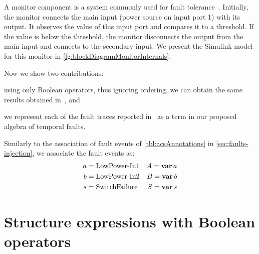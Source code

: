 \documentclass[12pt,openright,twoside,a4paper,oldfontcommands,english,brazil,final]{abntex2}
\theoremstyle{theo}
\newcommand{\simulink}{Simulink\xspace}
\def\varop{\ensuremath\operatorname{\mathbf{var}}}
\newcommand{\var}[1]{\ensuremath\varop #1}
\begin{document}
A monitor component is a system commonly used for fault tolerance~\cite{ONB2002,KK2007}.
Initially, the monitor connects the main input (power source on input port 1) with its output.
It observes the value of this input port and compares it to a threshold.
If the value is below the threshold, the monitor disconnects the output from the main input and connects to the secondary input.
We present the \simulink model for this monitor in \cref{fg:blockDiagramMonitorInternals}.


Now we show two contributions:
\begin{alineasinline}
  \item using only Boolean operators, thus ignoring ordering, we can obtain the same results obtained in~\cite{DM2012}, and
  \item we represent each of the fault traces reported in~\cite{DM2012} as a term in our proposed algebra of temporal faults.
\end{alineasinline}
Similarly to the association of fault events of \cref{tbl:acsAnnotations} in \cref{sec:faults-injection}, we associate the fault events as:
%
\begin{align*}
a &= \text{LowPower-In1}& A = \var a\\
b &= \text{LowPower-In2}& B = \var b\\
s &= \text{SwitchFailure}& S = \var s
\end{align*}

\section{Structure expressions with Boolean operators}
\label{sec:structure-expressions-boolean-operators}
\end{document}
